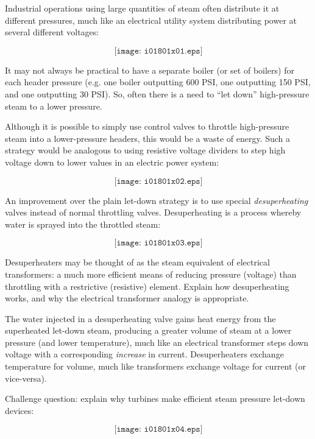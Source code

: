 

Industrial operations using large quantities of steam often distribute it at different pressures, much like an electrical utility system distributing power at several different voltages:

$$\texttt{[image: i01801x01.eps]}$$

It may not always be practical to have a separate boiler (or set of boilers) for each header pressure (e.g. one boiler outputting 600 PSI, one outputting 150 PSI, and one outputting 30 PSI).  So, often there is a need to ``let down'' high-pressure steam to a lower pressure.

Although it is possible to simply use control valves to throttle high-pressure steam into a lower-pressure headers, this would be a waste of energy.  Such a strategy would be analogous to using resistive voltage dividers to step high voltage down to lower values in an electric power system:

$$\texttt{[image: i01801x02.eps]}$$

An improvement over the plain let-down strategy is to use special {\it desuperheating} valves instead of normal throttling valves.  Desuperheating is a process whereby water is sprayed into the throttled steam:

$$\texttt{[image: i01801x03.eps]}$$

Desuperheaters may be thought of as the steam equivalent of electrical transformers: a much more efficient means of reducing pressure (voltage) than throttling with a restrictive (resistive) element.  Explain how desuperheating works, and why the electrical transformer analogy is appropriate.







The water injected in a desuperheating valve gains heat energy from the superheated let-down steam, producing a greater volume of steam at a lower pressure (and lower temperature), much like an electrical transformer steps down voltage with a corresponding {\it increase} in current.  Desuperheaters exchange temperature for volume, much like transformers exchange voltage for current (or vice-versa).

\vskip 10pt

Challenge question: explain why turbines make efficient steam pressure let-down devices:

$$\texttt{[image: i01801x04.eps]}$$











